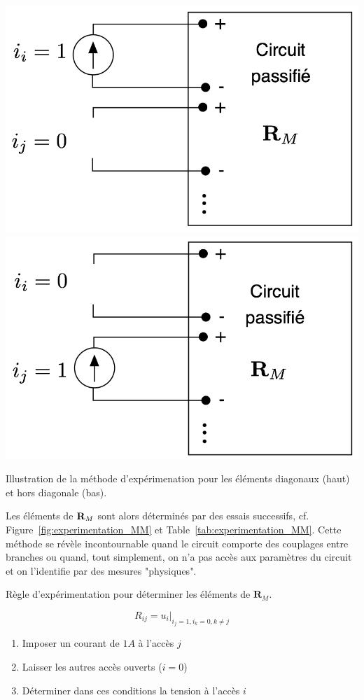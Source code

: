 \begin{marginfigure}[-1cm]
	\centering
	\includegraphics[width=\linewidth]{figs/methodes-generales/experimentation_MM_ii} 
	\includegraphics[width=\linewidth]{figs/methodes-generales/experimentation_MM_ij}
	\caption{Illustration de la méthode d'expérimenation pour les éléments diagonaux (haut) et hors diagonale (bas).}
	\label{fig:experimentation_MM}
\end{marginfigure}

Les éléments de ${\bf R}_M$ sont alors déterminés par des essais
successifs, cf. Figure~\ref{fig:experimentation_MM} et Table~\ref{tab:experimentation_MM}. Cette méthode se révèle incontournable quand le circuit comporte des couplages entre branches ou quand, tout simplement, on n'a pas accès aux paramètres du circuit et on l'identifie par des mesures "physiques".
\begin{table}[htb]
	\caption{Règle d'expérimentation pour déterminer les éléments de $\mathbf{R}_M$.}\label{tab:experimentation_MM}
	\begin{boxedminipage}{\textwidth}
		\[R_{ij}= u_{i}|_{i_{j}=1, i_{k}=0,k\neq j}\]
		\begin{enumerate}
			\item Imposer un courant  de $1 A$ à l'accès $j$
			\item Laisser les autres accès ouverts ($i=0$)
			\item Déterminer dans ces conditions la tension à l'accès $i$
		\end{enumerate}
	\end{boxedminipage}
\end{table}

